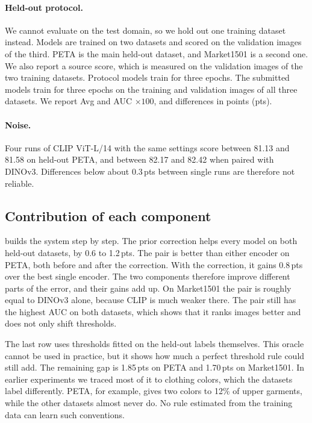 \documentclass[10pt,twocolumn,letterpaper]{article}
\newcommand{\pts}{\,pts}
\begin{document}
\paragraph{Held-out protocol.} We cannot evaluate on the test domain, so we hold out one training dataset instead. Models are trained on two datasets and scored on the validation images of the third. PETA is the main held-out dataset, and Market1501 is a second one. We also report a source score, which is measured on the validation images of the two training datasets. Protocol models train for three epochs. The submitted models train for three epochs on the training and validation images of all three datasets. We report Avg and AUC $\times100$, and differences in points (pts).

\paragraph{Noise.} Four runs of CLIP ViT-L/14 with the same settings score between 81.13 and 81.58 on held-out PETA, and between 82.17 and 82.42 when paired with DINOv3. Differences below about 0.3\pts{} between single runs are therefore not reliable.

\subsection{Contribution of each component}
\label{sec:exp_main}

 builds the system step by step. The prior correction helps every model on both held-out datasets, by 0.6 to 1.2\pts. The pair is better than either encoder on PETA, both before and after the correction. With the correction, it gains 0.8\pts{} over the best single encoder. The two components therefore improve different parts of the error, and their gains add up. On Market1501 the pair is roughly equal to DINOv3 alone, because CLIP is much weaker there. The pair still has the highest AUC on both datasets, which shows that it ranks images better and does not only shift thresholds.

The last row uses thresholds fitted on the held-out labels themselves. This oracle cannot be used in practice, but it shows how much a perfect threshold rule could still add. The remaining gap is 1.85\pts{} on PETA and 1.70\pts{} on Market1501. In earlier experiments we traced most of it to clothing colors, which the datasets label differently. PETA, for example, gives two colors to 12\% of upper garments, while the other datasets almost never do. No rule estimated from the training data can learn such conventions.
\end{document}
